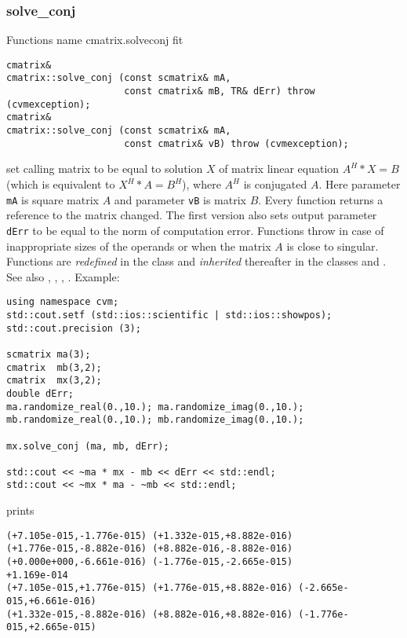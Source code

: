 \subsubsection{solve\_conj}
Functions%
\pdfdest name {cmatrix.solveconj} fit
\begin{verbatim}
cmatrix&
cmatrix::solve_conj (const scmatrix& mA,
                     const cmatrix& mB, TR& dErr) throw (cvmexception);
cmatrix&
cmatrix::solve_conj (const scmatrix& mA,
                     const cmatrix& vB) throw (cvmexception);
\end{verbatim}
set calling matrix to be equal to  solution $X$ of 
matrix linear equation
$A^H*X=B$ (which is equivalent to $X^H*A=B^H$), where $A^H$ is conjugated $A$.
Here parameter \verb"mA" is square matrix $A$
and parameter \verb"vB" is matrix $B$.
Every function returns a reference to the matrix changed.
The first version also sets  output parameter \verb"dErr" to be equal
to the norm of computation error.
Functions throw 
in case of inappropriate sizes
of the operands or when the matrix $A$ is close to singular.
Functions are \emph{redefined} in  the class
 and
\emph{inherited} thereafter in the classes
 and
.
See also
,
,
,
.
Example:
\begin{Verbatim}
using namespace cvm;
std::cout.setf (std::ios::scientific | std::ios::showpos); 
std::cout.precision (3);

scmatrix ma(3);
cmatrix  mb(3,2);
cmatrix  mx(3,2);
double dErr;
ma.randomize_real(0.,10.); ma.randomize_imag(0.,10.);
mb.randomize_real(0.,10.); mb.randomize_imag(0.,10.);

mx.solve_conj (ma, mb, dErr);

std::cout << ~ma * mx - mb << dErr << std::endl;
std::cout << ~mx * ma - ~mb << std::endl;
\end{Verbatim}
prints
\begin{Verbatim}
(+7.105e-015,-1.776e-015) (+1.332e-015,+8.882e-016)
(+1.776e-015,-8.882e-016) (+8.882e-016,-8.882e-016)
(+0.000e+000,-6.661e-016) (-1.776e-015,-2.665e-015)
+1.169e-014
(+7.105e-015,+1.776e-015) (+1.776e-015,+8.882e-016) (-2.665e-015,+6.661e-016)
(+1.332e-015,-8.882e-016) (+8.882e-016,+8.882e-016) (-1.776e-015,+2.665e-015)
\end{Verbatim}
\newpage







